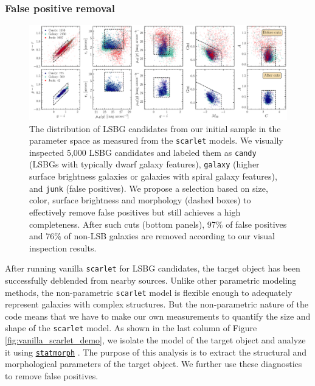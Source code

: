 \documentclass[twocolumn,astrosymb,twocolappendix]{aastex631}
\newcommand{\code}[1]{\texttt{#1}}
\begin{document}
\begin{CJK*}{UTF8}{gbsn}
\subsubsection{False positive removal}\label{sec:non-par-measurement}

\begin{figure}
	\vbox{
		\centering
		\includegraphics[width=1.0\linewidth]{deblending_cuts.pdf}
	}
	\caption{The distribution of LSBG candidates from our initial sample in the parameter space as measured from the \code{scarlet} models. We visually inspected 5,000 LSBG candidates and labeled them as \code{candy} (LSBGs with typically dwarf galaxy features), \code{galaxy} (higher surface brightness galaxies or galaxies with spiral galaxy features), and \code{junk} (false positives). We propose a selection based on size, color, surface brightness and morphology (dashed boxes) to effectively remove false positives but still achieves a high completeness. After such cuts (bottom panels), 97\% of false positives and 76\% of non-LSB galaxies are removed according to our visual inspection results. 
	}
	\label{fig:deblending_cuts}
\end{figure}

After running vanilla \code{scarlet} for LSBG candidates, the target object has been successfully deblended from nearby sources. Unlike other parametric modeling methods, the non-parametric \code{scarlet} model is flexible enough to adequately represent galaxies with complex structures. But the non-parametric nature of the code means that we have to make our own measurements to quantify the size and shape of the \code{scarlet} model. As shown in the last column of Figure \ref{fig:vanilla_scarlet_demo}, we isolate the model of the target object and analyze it using \href{https://statmorph.readthedocs.io/en/latest/}{\code{statmorph}} \citep{statmorph}. The purpose of this analysis is to extract the structural and morphological parameters of the target object. We further use these diagnostics to remove false positives. 


\end{CJK*}
\end{document}
